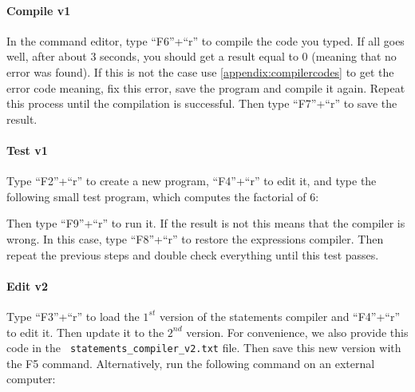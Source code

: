 \medskip \paragraph{Compile v1} In the command editor, type ``F6''+``r'' to
compile the code you typed. If all goes well, after about 3 seconds, you should
get a result equal to 0 (meaning that no error was found). If this is not the
case use \cref{appendix:compilercodes} to get the error code meaning, fix this
error, save the program and compile it again. Repeat this process until the
compilation is successful. Then type ``F7''+``r'' to save the result.


\medskip \paragraph{Test v1} Type ``F2''+``r'' to create a new program,
``F4''+``r'' to edit it, and type the following small test program, which
computes the factorial of 6:


\noindent Then type ``F9''+``r'' to run it. If the result is not
 this means that the compiler is wrong. In this case, type
``F8''+``r'' to restore the expressions compiler. Then repeat the previous
steps and double check everything until this test passes.


\medskip \paragraph*{Edit v2} Type ``F3''+``r'' to load the $1^{st}$ version of
the statements compiler and ``F4''+``r'' to edit it. Then update it to the
$2^{nd}$ version. For convenience, we also provide this code in the {\tt
  statements\_compiler\_v2.txt} file. Then save this new version with the F5
command. Alternatively, run the following command on an external computer:

